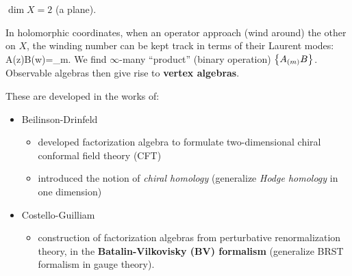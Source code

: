 \documentclass[11pt, oneside]{article}
\begin{document}
\begin{eg} $\operatorname{dim }X=2$ (a plane). 
\begin{figure}[!htpb]\centering




\end{figure}

\noindent In holomorphic coordinates, when an operator approach (wind around) the other on $X$, the winding number can be kept track in terms of their Laurent modes:
\bea 
A(z)B(w)=\sum_{m\in \bZ}.
\eea
We find $\infty$-many ``product'' (binary operation) $\left\{ A_{(m)}B \right\}$. Observable algebras then give rise to \textbf{vertex algebras}.
\end{eg}

These are developed in the works of:
\begin{itemize}
    \item Beilinson-Drinfeld
    \begin{itemize}
        \item developed factorization algebra to formulate two-dimensional chiral conformal field theory (CFT)
        \item introduced the notion of {\em chiral homology} (generalize {\em Hodge homology} in one dimension)
    \end{itemize}
    \item Costello-Guilliam
    \begin{itemize}
        \item construction of factorization algebras from perturbative renormalization theory, in the \textbf{Batalin-Vilkovisky (BV) formalism} (generalize BRST formalism in gauge theory).
    \end{itemize}
\end{itemize}
\end{document}
